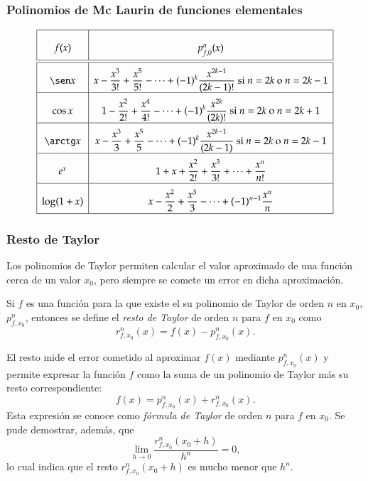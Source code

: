 \begin{frame}
\frametitle{Polinomios de Mc Laurin de funciones elementales}
\[
\renewcommand{\arraystretch}{2.5}
\begin{array}{|c|c|}
\hline
f(x) & p_{f,0}^n(x) \\
\hline\hline
\sen x & \displaystyle x-\frac{x^3}{3!}+\frac{x^5}{5!}-\cdots +(-1)^k\frac{x^{2k-1}}{(2k-1)!} \mbox{ si $n=2k$ o $n=2k-1$}\\
\hline
\cos x &  \displaystyle 1-\frac{x^2}{2!}+\frac{x^4}{4!}-\cdots +(-1)^k\frac{x^{2k}}{(2k)!} \mbox{ si $n=2k$ o $n=2k+1$}\\
\hline
\arctg x &  \displaystyle x-\frac{x^3}{3}+\frac{x^5}{5}-\cdots +(-1)^k\frac{x^{2k-1}}{(2k-1)} \mbox{ si $n=2k$ o $n=2k-1$}\\
\hline
e^x & \displaystyle 1+x+\frac{x^2}{2!}+\frac{x^3}{3!}+\cdots + \frac{x^n}{n!}\\
\hline
\log(1+x) & \displaystyle x-\frac{x^2}{2}+\frac{x^3}{3}-\cdots +(-1)^{n-1}\frac{x^n}{n}\\
\hline
\end{array}
\]
\end{frame}


\begin{frame}
\frametitle{Resto de Taylor}
Los polinomios de Taylor permiten calcular el valor aproximado de una función cerca de un valor $x_0$, pero siempre se comete un error en dicha aproximación.
\begin{definicion}
Si $f$ es una función para la que existe el su polinomio de Taylor de orden $n$ en $x_0$, $p_{f,x_0}^n$, entonces se define el \emph{resto de Taylor} de orden $n$ para $f$ en $x_0$ como
\[
r_{f,x_0}^n(x)=f(x)-p_{f,x_0}^n(x).
\]
\end{definicion}

El resto mide el error cometido al aproximar $f(x)$ mediante $p_{f,x_0}^n(x)$ y permite expresar la función $f$ como la suma de un polinomio de Taylor más su resto correspondiente:
\[
f(x)=p_{f,x_0}^n(x) + r_{f,x_0}^n(x).
\]
Esta expresión se conoce como \emph{fórmula de Taylor} de orden $n$ para $f$ en $x_0$. Se pude demostrar, además, que
\[
\lim_{h\rightarrow 0}\frac{r_{f,x_0}^n(x_0+h)}{h^n}=0,
\]
lo cual indica que el resto $r_{f,x_0}^n(x_0+h)$ es mucho menor que $h^n$.
\end{frame}






